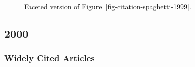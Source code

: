 \documentclass[
  10pt,
  letterpaper,
  DIV=11,
  numbers=noendperiod,
  twoside]{scrartcl}
\begin{document}
\begin{figure}


\caption{\label{fig-citation-facet-1999}Faceted version of
Figure~\ref{fig-citation-spaghetti-1999}.}

\end{figure}%

\newpage

\subsection{2000}\label{sec-s2000}

\subsubsection*{Widely Cited Articles}\label{widely-cited-articles-44}
\end{document}
